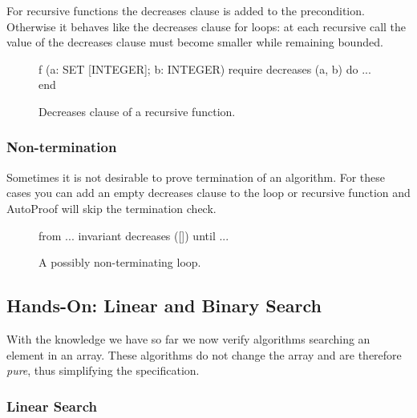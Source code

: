 \documentclass[a4paper,12pt]{article}
\newcommand{\AutoProof}{Auto\-Proof\xspace}
\begin{document}
For recursive functions the decreases clause is added to the precondition. Otherwise it behaves like the decreases clause for loops: at each recursive call the value of the decreases clause must become smaller while remaining bounded.

\begin{figure}
\begin{erunning}
f (a: SET [INTEGER]; b: INTEGER)
	require
		decreases (a, b)
	do ... end
\end{erunning}
\hspace{0.5cm}
\caption*{Decreases clause of a recursive function.}
\end{figure}

\subsubsection*{Non-termination}

Sometimes it is not desirable to prove termination of an algorithm. For these cases you can add an empty decreases clause to the loop or recursive function and \AutoProof will skip the termination check.

\begin{figure}
\begin{erunning}
from ...
invariant
	decreases ([])
until ...
\end{erunning}
\hspace{0.5cm}
\caption*{A possibly non-terminating loop.}
\end{figure}

\subsection{Hands-On: Linear and Binary Search}

With the knowledge we have so far we now verify algorithms searching an element in an array. These algorithms do not change the array and are therefore \emph{pure}, thus simplifying the specification.

\subsubsection*{Linear Search}
\end{document}

